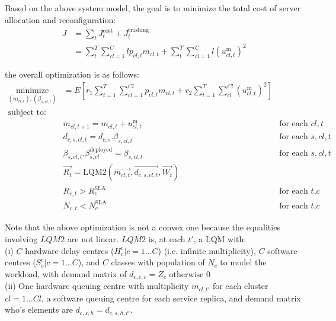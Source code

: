  Based on the above system model, the goal is to minimize the total cost of server allocation and reconfiguration: 
  \begin{align}
    J 
  & =\sum_t J^\text{cost}_t+J^\text{trashing}_t  \nonumber \\
  & =\sum_t^T \sum_{cl=1}^Cl p_{cl,t} m_{cl,t} + \sum_t^T \sum_{cl=1}^Cl (u^\text{m}_{cl,t})^2
  \end{align} 
  
  the  overall optimization is as follows:    
\begin{align} 
      \underset{(m_{cl,t}), (\beta_{s,cl,t})}  {\text{minimize}}  
       	 & =E\left[  r_1 \sum^{T}_{t=1} \sum^{Cl}_{cl=1} p_{cl,t} m_{cl,t}+ r_2 \sum^{T}_{t=1}\sum^{Cl}_{cl} (u^\text{m}_{cl,t})^2  \right]  \nonumber  \\
     \text{subject to:} \nonumber \\ 
	 &  m_{cl,t+1} = m_{cl,t} + u^\text{m}_{cl,t}  &  \text{for each $cl,t$}  \nonumber\\
	 & d_{c,s,cl,t} = d_{c,s} . \beta_{s,cl,t}  &  \text{for each $s,cl,t$}  \nonumber\\  
	 & \beta_{s,cl,t} . \beta^\text{deployed}_{s,cl} = \beta_{s,cl,t}   &  \text{for each $s,cl,t$}  \nonumber  \\
	 & \overrightarrow{R_{t}} =  \text{LQM2}(\overrightarrow{m_{cl,t}},  \overrightarrow{d_{c,s,cl,t}}, \overrightarrow{W_{t}})    \label{eq:lqm-autoscaling}  \nonumber  \\ 
	 & R_{c,t} > R_{c}^\text{SLA} & \text{for each $t$,$c$}   \nonumber \\        
	 & N_{c,t}<N^\text{SLA}_c  &\text{for each $t$,$c$}  \nonumber
  \end{align}       
  
  Note that the above optimization is not a convex one because the equalities involving $LQM2$ are not linear. $LQM2$ is, at each $t'$, a LQM with:  \\  
 (i) $C$ hardware delay centres ($H^{\text{c}}_c|c=1...C$) (i.e. infinite multiplicity), $C$ software centres ($S^{\text{c}}_c|c=1...C$), and $C$ classes with population of $N_c$  to model the workload, with demand matrix of $d_{c,c,c}=Z_c \text{ otherwise } 0$\\   
 (ii) One hardware queuing centre with multiplicity  $m_{cl,t'}$ for each cluster $cl=1...Cl$, 
 a software queuing centre for each service replica, and demand matrix who's elements are $d_{c,s,h}=d_{c,s,h,t'}$.  
  
